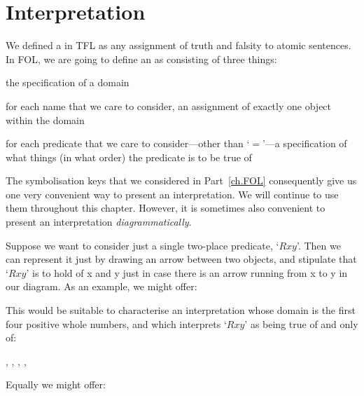 \section{Interpretation}
We defined a  in TFL as any assignment of truth and falsity to atomic sentences. In FOL, we are going to define an  as consisting of three things:
	\begin{ebullet}	
		\item the specification of a domain
		\item for each name that we care to consider, an assignment of exactly one object within the domain 
		\item for each predicate that we care to consider---other than `$=$'---a specification of what things (in what order) the predicate is to be true of
	\end{ebullet}
The symbolisation keys that we considered in Part~\ref{ch.FOL} consequently give us one very convenient way to present an interpretation. We will continue to use them throughout this chapter. However, it is sometimes also convenient to present an interpretation \emph{diagrammatically}. 


Suppose we want to consider just a single two-place predicate, `$Rxy$'. Then we can represent it just by drawing an arrow between two objects, and stipulate that `$Rxy$' is to hold of x and y just in case there is an arrow running from x to y in our diagram. As an example, we might offer:
\begin{center}
\end{center}
This would be suitable to characterise an interpretation whose domain is the first four positive whole numbers, and which interprets `$Rxy$' as being true of and only of:
	\begin{center}
		, 
		, 
		, 
		, 
	\end{center}
Equally we might offer:

